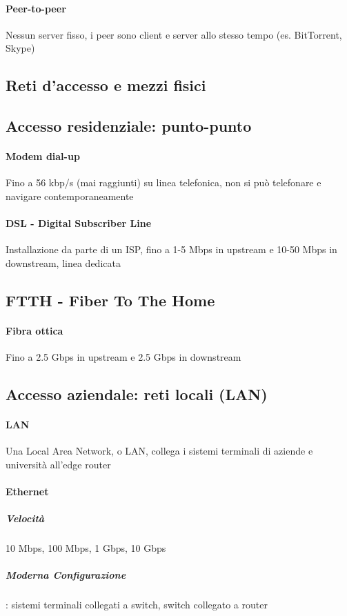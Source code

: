         \paragraph{Peer-to-peer} Nessun server fisso, i peer sono client e server allo stesso tempo (es. BitTorrent, Skype)
        \subsection{Reti d’accesso e mezzi fisici}
        \subsection{Accesso residenziale: punto-punto}
            \paragraph{Modem dial-up} Fino a 56 kbp/s (mai raggiunti) su linea telefonica, non si può telefonare e navigare contemporaneamente
            \paragraph{DSL - Digital Subscriber Line} Installazione da parte di un ISP, fino a 1-5 Mbps in upstream e 10-50 Mbps in downstream, linea dedicata
        \subsection{FTTH - Fiber To The Home}
            \paragraph{Fibra ottica} Fino a 2.5 Gbps in upstream e 2.5 Gbps in downstream
        \subsection{Accesso aziendale: reti locali (LAN)}
            \paragraph{LAN} Una Local Area Network, o LAN, collega i sistemi terminali di aziende e università all’edge router
            \paragraph{Ethernet} 
                \subparagraph{Velocità} 10 Mbps, 100 Mbps, 1 Gbps, 10 Gbps 
                \subparagraph{Moderna Configurazione}: sistemi terminali collegati a switch, switch collegato a router 
